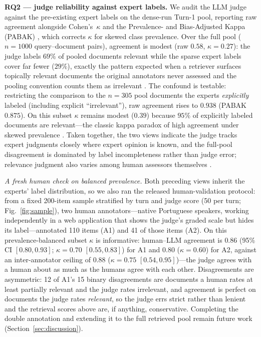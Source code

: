 \documentclass[conference]{IEEEtran}
\begin{document}
\textbf{RQ2 --- judge reliability against expert labels.}
We audit the LLM judge against the pre-existing expert labels on the dense-run
Turn-1 pool, reporting raw agreement alongside Cohen's~$\kappa$ \cite{Cohen1960}
and the Prevalence- and Bias-Adjusted Kappa (PABAK) \cite{Byrt1993PABAK}, which
corrects $\kappa$ for skewed class prevalence. Over the full pool ($n{=}1000$
query--document pairs), agreement is modest (raw $0.58$, $\kappa{=}0.27$): the judge labels $69\%$ of
pooled documents relevant while the sparse expert labels cover far fewer ($29\%$),
exactly the pattern expected when a retriever surfaces topically relevant documents
the original annotators never assessed and the pooling convention counts them as
irrelevant \cite{Voorhees2000}. The confound is testable: restricting the
comparison to the $n{=}305$ pool documents the experts \emph{explicitly} labeled
(including explicit ``irrelevant''), raw agreement rises to $\mathbf{0.938}$
(PABAK $0.875$). On this subset $\kappa$ remains modest ($0.39$) because
$95\%$ of explicitly labeled documents are relevant---the classic kappa paradox of
high agreement under skewed prevalence \cite{Feinstein1990,Byrt1993PABAK}. Taken
together, the two views indicate the judge tracks expert judgments closely where
expert opinion is known, and the full-pool disagreement is dominated by label
incompleteness rather than judge error; relevance judgment also varies among human
assessors themselves \cite{Voorhees2000}.

\emph{A fresh human check on balanced prevalence.} Both preceding views inherit
the experts' label distribution, so we also ran the released human-validation
protocol: from a fixed 200-item sample stratified by turn and judge score (50
per turn; Fig.~\ref{fig:sample}), two human annotators---native Portuguese
speakers, working independently in a web application that shows the judge's
graded scale but hides its label---annotated 110 items (A1) and 41 of those
items (A2). On this prevalence-balanced subset $\kappa$ is informative:
human--LLM agreement is $0.86$ (95\% CI $[0.80,0.93]$; $\kappa{=}0.70$
$[0.55,0.83]$) for A1 and $0.80$ ($\kappa{=}0.60$) for A2, against an
inter-annotator ceiling of $0.88$ ($\kappa{=}0.75$ $[0.54,0.95]$)---the judge
agrees with a human about as much as the humans agree with each other.
Disagreements are asymmetric: 12 of A1's 15 binary disagreements are documents
a human rates at least partially relevant and the judge rates irrelevant, and
agreement is perfect on documents the judge rates \emph{relevant}, so the judge
errs strict rather than lenient and the retrieval scores above are, if
anything, conservative. Completing the double annotation and extending it to
the full retrieved pool remain future work (Section~\ref{sec:discussion}).
\end{document}
